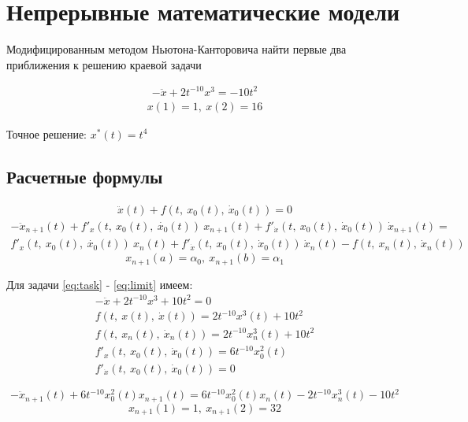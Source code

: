 \documentclass[12pt]{article}
\begin{document}
\section*{Непрерывные математические модели}

Модифицированным методом Ньютона-Канторовича найти первые два приближения к решению краевой задачи

\begin{gather}
    -\ddot{x} + 2t^{-10}x^3 = -10t^2 \label{eq:task}
\end{gather}
\begin{gather}
    x(1)=1,\ x(2)=16 \label{eq:limit}
\end{gather}

Точное решение: $x^*(t) = t^4$

\subsection*{Расчетные формулы}



\begin{gather}
\ddot{x}(t) + f(t,\ x_0(t),\ \dot{x}_0(t)) = 0
\end{gather}
\begin{multline}
	-\ddot{x}_{n+1}(t) + f'_x(t,\ x_0(t),\ \dot{x_0}(t))\ x_{n+1}(t) +
	f'_{\dot{x}}(t,\ x_0(t),\ \dot{x}_0(t))\ \dot{x}_{n+1}(t) = \\
	f'_x(t,\ x_0(t),\ \dot{x_0}(t))\ x_n(t) +
	f'_{\dot{x}}(t,\ x_0(t),\ \dot{x}_0(t))\ \dot{x}_n(t) -
	f(t,\ x_n(t),\ \dot{x}_n(t))
\end{multline}
\begin{equation}
	x_{n+1}(a) = \alpha_0,\ x_{n+1}(b) = \alpha_1
\end{equation}

Для задачи \eqref{eq:task} - \eqref{eq:limit} имеем:
\begin{gather*}
	-\ddot{x} + 2t^{-10}x^3 + 10t^2 = 0 \\
	f(t,\ x(t),\ \dot{x}(t)) = 2t^{-10}x^3(t) + 10t^2 \\
	f(t,\ x_n(t),\ \dot{x}_n(t)) = 2t^{-10}x^3_n(t) + 10t^2 \\
	f'_x(t,\ x_0(t),\ \dot{x}_0(t)) = 6t^{-10}x^2_0(t) \\
	f'_{\dot{x}}(t,\ x_0(t),\ \dot{x}_0(t)) = 0
\end{gather*}

\begin{equation}
    -\ddot{x}_{n+1}(t) + 6t^{-10}x^2_0(t)x_{n+1}(t) =
     6t^{-10}x^2_0(t)x_n(t) - 2t^{-10}x^3_n(t) - 10t^2
\end{equation}
\begin{equation}
    x_{n+1}(1)=1,\ x_{n+1}(2)=32
\end{equation}
\end{document}
